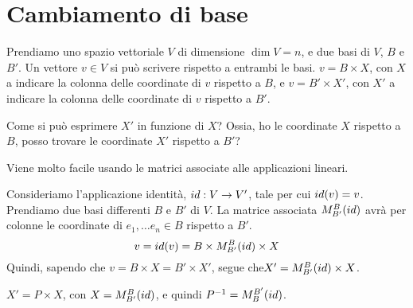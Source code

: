 \section{Cambiamento di base}

Prendiamo uno spazio vettoriale $V$ di dimensione $\dim V = n$, e due basi di $V$, $B$ e $B'$. Un vettore $v \in V$ si pu\`o scrivere rispetto a entrambi le basi. $v = B \times X$, con $X$ a indicare la colonna delle coordinate di $v$ rispetto a $B$, e $v = B' \times X'$, con $X'$ a indicare la colonna delle coordinate di $v$ rispetto a $B'$.

Come si pu\`o esprimere $X'$ in funzione di $X$? Ossia, ho le coordinate $X$ rispetto a $B$, posso trovare le coordinate $X'$ rispetto a $B'$?

Viene molto facile usando le matrici associate alle applicazioni lineari.

Consideriamo l'applicazione identit\`a, $id : V \to V'$, tale per cui $id(v) = v$. Prendiamo due basi differenti $B$ e $B'$ di $V$. La matrice associata $M_{B'}^{B} (id)$ avr\`a per colonne le coordinate di $e_1, \ldots e_n \in B$ rispetto a $B'$.
\[
v = id(v) = B \times M_{B'}^{B} (id) \times X
\]
Quindi, sapendo che $v = B \times X = B' \times X'$, segue che$ X' = M_{B'}^{B} (id) \times X$.

$X' = P \times X$, con $X = M_{B'}^{B} (id)$, e quindi $P^{-1} = M_{B}^{B'} (id)$.

